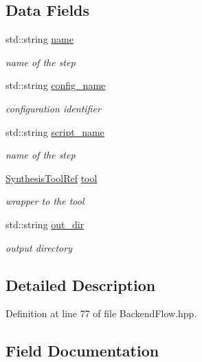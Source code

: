 \subsection*{Data Fields}
\begin{DoxyCompactItemize}
\item 
std\+::string \hyperlink{structBackendStep_aebef81b05bdd51f7d4061a8a30e87371}{name}
\begin{DoxyCompactList}\small\item\em name of the step \end{DoxyCompactList}\item 
std\+::string \hyperlink{structBackendStep_a590847b5576a7f136d28419b9204a7d9}{config\+\_\+name}
\begin{DoxyCompactList}\small\item\em configuration identifier \end{DoxyCompactList}\item 
std\+::string \hyperlink{structBackendStep_a0cb02c4523f370cd78cf5873a53278d5}{script\+\_\+name}
\begin{DoxyCompactList}\small\item\em name of the step \end{DoxyCompactList}\item 
\hyperlink{SynthesisTool_8hpp_af82cb8fc071612a27507a7c212097e58}{Synthesis\+Tool\+Ref} \hyperlink{structBackendStep_aa34e0b7ceeb99fd07301832b9c68f462}{tool}
\begin{DoxyCompactList}\small\item\em wrapper to the tool \end{DoxyCompactList}\item 
std\+::string \hyperlink{structBackendStep_aacd4173a11c0ec3a5f70fbf00a6ff1e3}{out\+\_\+dir}
\begin{DoxyCompactList}\small\item\em output directory \end{DoxyCompactList}\end{DoxyCompactItemize}


\subsection{Detailed Description}


Definition at line 77 of file Backend\+Flow.\+hpp.



\subsection{Field Documentation}
\mbox{\label{structBackendStep_a590847b5576a7f136d28419b9204a7d9}} 
